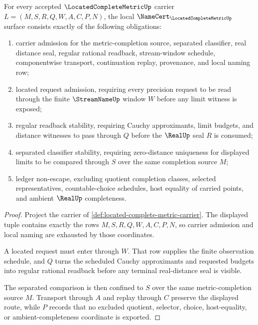 \begin{theorem}\label{thm:located-complete-metric-namecert-obligation-surface}
For every accepted $\LocatedCompleteMetricUp$ carrier $L=(M,S,R,Q,W,A,C,P,N)$, the local $\NameCert_{\LocatedCompleteMetricUp}$ surface consists exactly of the following obligations:
\begin{enumerate}
\item carrier admission for the metric-completion source, separated classifier, real distance seal, regular rational readback, stream-window schedule, componentwise transport, continuation replay, provenance, and local naming row;
\item located request admission, requiring every precision request to be read through the finite $\StreamNameUp$ window $W$ before any limit witness is exposed;
\item regular readback stability, requiring Cauchy approximants, limit budgets, and distance witnesses to pass through $Q$ before the $\RealUp$ seal $R$ is consumed;
\item separated classifier stability, requiring zero-distance uniqueness for displayed limits to be compared through $S$ over the same completion source $M$;
\item ledger non-escape, excluding quotient completion classes, selected representatives, countable-choice schedules, host equality of carried points, and ambient $\RealUp$ completeness.
\end{enumerate}
\end{theorem}
\begin{proof}
Project the carrier of \autoref{def:located-complete-metric-carrier}. The displayed tuple contains exactly the rows $M,S,R,Q,W,A,C,P,N$, so carrier admission and local naming are exhausted by those coordinates.

A located request must enter through $W$. That row supplies the finite observation schedule, and $Q$ turns the scheduled Cauchy approximants and requested budgets into regular rational readback before any terminal real-distance seal is visible.

The separated comparison is then confined to $S$ over the same metric-completion source $M$. Transport through $A$ and replay through $C$ preserve the displayed route, while $P$ records that no excluded quotient, selector, choice, host-equality, or ambient-completeness coordinate is exported.
\end{proof}

